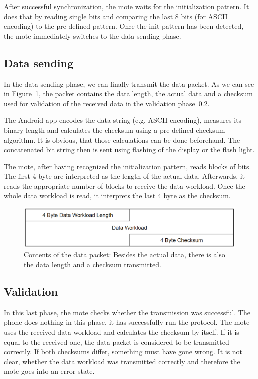 \documentclass{sig-alternate} %
\begin{document}
After successful synchronization, the mote waits for the initialization pattern.
It does that by reading single bits and comparing the last 8 bits (for ASCII encoding) to the pre-defined pattern.
Once the init pattern has been detected, the mote immediately switches to the data sending phase.

\subsection{Data sending}
\label{sub:data_sending}

In the data sending phase, we can finally transmit the data packet.
As we can see in Figure~\ref{fig:data_packet}, the packet contains the data length, the actual data and a checksum used for validation of the received data in the validation phase~\ref{sub:validation}.

The Android app encodes the data string (e.g. ASCII encoding), measures its binary length and calculates the checksum using a pre-defined checksum algorithm.
It is obvious, that those calculations can be done beforehand.
The concatenated bit string then is sent using flashing of the display or the flash light.

The mote, after having recognized the initialization pattern, reads blocks of bits.
The first 4 byte are interpreted as the length of the actual data.
Afterwards, it reads the appropriate number of blocks to receive the data workload.
Once the whole data workload is read, it interprets the last 4 byte as the checksum.

\begin{figure}
	\centering
	\includegraphics[scale=.3]{images/data_packet.png}
	\caption{Contents of the data packet: Besides the actual data, there is also the data length and a checksum transmitted.}
	\label{fig:data_packet}
\end{figure}

\subsection{Validation}
\label{sub:validation}

In this last phase, the mote checks whether the transmission was successful.
The phone does nothing in this phase, it has successfully run the protocol.
The mote uses the received data workload and calculates the checksum by itself.
If it is equal to the received one, the data packet is considered to be transmitted correctly.
If both checksums differ, something must have gone wrong.
It is not clear, whether the data workload was transmitted correctly and therefore the mote goes into an error state.
\end{document}
